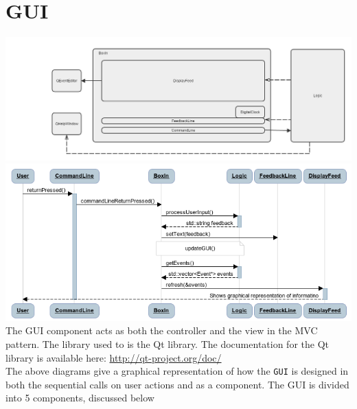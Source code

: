 \documentclass[12pt]{extarticle}
\begin{document}
\newpage
\section{GUI}

\includegraphics[width=\textwidth]{component_design_gui}
\includegraphics[width=\textwidth]{gui_sequence_diagram}
The GUI component acts as both the controller and the view in the MVC pattern. The library used to is the Qt library. The documentation for the Qt library is available here: \href{http://qt-project.org/doc/}{http://qt-project.org/doc/}\\
The above diagrams give a graphical representation of how the \texttt{GUI} is designed in both the sequential calls on user actions and as a component.
The GUI is divided into 5 components, discussed below
\end{document}
